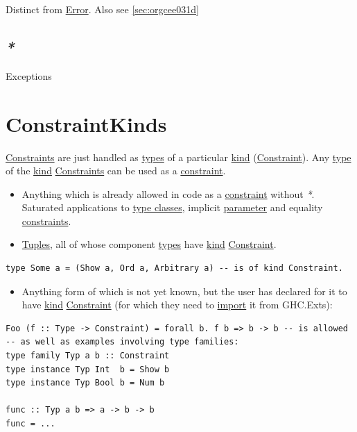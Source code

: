 \documentclass[a4paper,14pt,oneside]{book}
\begin{document}
Distinct from \hyperref[orgb19ba50]{Error}. Also see \ref{sec:orgcee031d}

\section{\emph{*}}
\label{sec:orgbe6cd18}

\label{orgb5855ed}Exceptions

\chapter{\label{orga5777d4}ConstraintKinds}
\label{sec:org88b1f9f}
\hyperref[orgf288051]{Constraints} are just handled as \hyperref[orgbcd424e]{types} of a particular \hyperref[orgf38d246]{kind} (\hyperref[org0a233e5]{Constraint}).
Any \hyperref[org26d9f7b]{type} of the \hyperref[orgf38d246]{kind} \hyperref[orgf288051]{Constraints} can be used as a \hyperref[org0a233e5]{constraint}.
\begin{itemize}
\item Anything which is already allowed in code as a \hyperref[org0a233e5]{constraint} without \emph{*}. Saturated applications to \hyperref[org3621c10]{type classes}, implicit \hyperref[org221fae8]{parameter} and equality \hyperref[orgf288051]{constraints}.
\item \hyperref[orgab163db]{Tuples}, all of whose component \hyperref[orgbcd424e]{types} have \hyperref[orgf38d246]{kind} \hyperref[org0a233e5]{Constraint}.
\end{itemize}
\begin{verbatim}
type Some a = (Show a, Ord a, Arbitrary a) -- is of kind Constraint.
\end{verbatim}
\begin{itemize}
\item Anything form of which is not yet known, but the user has declared for it to have \hyperref[orgf38d246]{kind} \hyperref[org0a233e5]{Constraint} (for which they need to \hyperref[orgf48b713]{import} it from GHC.Exts):
\end{itemize}
\begin{verbatim}
Foo (f :: Type -> Constraint) = forall b. f b => b -> b -- is allowed
-- as well as examples involving type families:
type family Typ a b :: Constraint
type instance Typ Int  b = Show b
type instance Typ Bool b = Num b

func :: Typ a b => a -> b -> b
func = ...
\end{verbatim}
\end{document}

